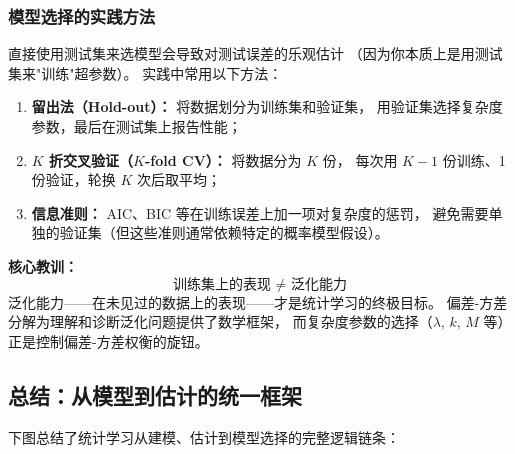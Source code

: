 \subsubsection{模型选择的实践方法}

直接使用测试集来选模型会导致对测试误差的乐观估计
（因为你本质上是用测试集来"训练"超参数）。
实践中常用以下方法：

\begin{enumerate}[label=(\arabic*)]
    \item \textbf{留出法（Hold-out）：} 将数据划分为训练集和验证集，
    用验证集选择复杂度参数，最后在测试集上报告性能；
    \item \textbf{$K$ 折交叉验证（$K$-fold CV）：} 将数据分为 $K$ 份，
    每次用 $K-1$ 份训练、1 份验证，轮换 $K$ 次后取平均；
    \item \textbf{信息准则：} AIC、BIC 等在训练误差上加一项对复杂度的惩罚，
    避免需要单独的验证集（但这些准则通常依赖特定的概率模型假设）。
\end{enumerate}

\medskip
\textbf{核心教训：}
\[
\boxed{\text{训练集上的表现 } \neq \text{ 泛化能力}}
\]
泛化能力——在未见过的数据上的表现——才是统计学习的终极目标。
偏差-方差分解为理解和诊断泛化问题提供了数学框架，
而复杂度参数的选择（$\lambda$, $k$, $M$ 等）正是控制偏差-方差权衡的旋钮。

\subsection{总结：从模型到估计的统一框架}

下图总结了统计学习从建模、估计到模型选择的完整逻辑链条：

